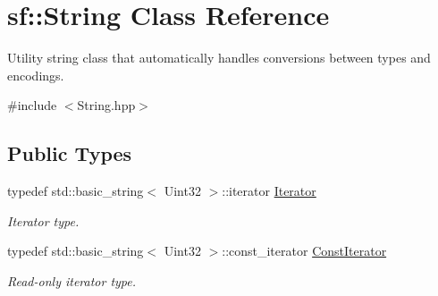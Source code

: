 \hypertarget{classsf_1_1_string}{}\section{sf\+:\+:String Class Reference}
\label{classsf_1_1_string}


Utility string class that automatically handles conversions between types and encodings.  




{\ttfamily \#include $<$String.\+hpp$>$}

\subsection*{Public Types}
\begin{DoxyCompactItemize}
\item 
\mbox{\label{classsf_1_1_string_ac90f2b7b28f703020f8d027e98806235}} 
typedef std\+::basic\+\_\+string$<$ Uint32 $>$\+::iterator \mbox{\hyperlink{classsf_1_1_string_ac90f2b7b28f703020f8d027e98806235}{Iterator}}
\begin{DoxyCompactList}\small\item\em Iterator type. \end{DoxyCompactList}\item 
\mbox{\label{classsf_1_1_string_a8e18efc2e8464f6eb82818902d527efa}} 
typedef std\+::basic\+\_\+string$<$ Uint32 $>$\+::const\+\_\+iterator \mbox{\hyperlink{classsf_1_1_string_a8e18efc2e8464f6eb82818902d527efa}{Const\+Iterator}}
\begin{DoxyCompactList}\small\item\em Read-\/only iterator type. \end{DoxyCompactList}\end{DoxyCompactItemize}
